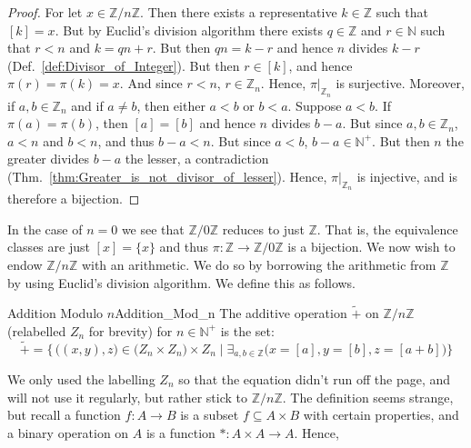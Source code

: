     \begin{proof}
        For let $x\in\mathbb{Z}/n\mathbb{Z}$. Then there exists a
        representative $k\in\mathbb{Z}$ such that $[k]=x$. But by
        Euclid's division algorithm there exists $q\in\mathbb{Z}$ and
        $r\in\mathbb{N}$ such that $r<n$ and $k=qn+r$. But then
        $qn=k-r$ and hence $n$ divides $k-r$
        (Def.~\ref{def:Divisor_of_Integer}). But then $r\in[k]$, and
        hence $\pi(r)=\pi(k)=x$. And since $r<n$, $r\in\mathbb{Z}_{n}$.
        Hence, $\pi|_{\mathbb{Z}_{n}}$ is surjective. Moreover, if
        $a,b\in\mathbb{Z}_{n}$ and if $a\ne{b}$, then either $a<b$ or
        $b<a$. Suppose $a<b$. If $\pi(a)=\pi(b)$, then $[a]=[b]$ and
        hence $n$ divides $b-a$. But since $a,b\in\mathbb{Z}_{n}$, $a<n$
        and $b<n$, and thus $b-a<n$. But since $a<b$,
        $b-a\in\mathbb{N}^{+}$. But then $n$ the greater divides $b-a$
        the lesser, a contradiction
        (Thm.~\ref{thm:Greater_is_not_divisor_of_lesser}). Hence,
        $\pi|_{\mathbb{Z}_{n}}$ is injective, and is therefore a
        bijection. 
    \end{proof}
    In the case of $n=0$ we see that $\mathbb{Z}/0\mathbb{Z}$ reduces to
    just $\mathbb{Z}$. That is, the equivalence classes are just
    $[x]=\{x\}$ and thus
    $\pi:\mathbb{Z}\rightarrow\mathbb{Z}/0\mathbb{Z}$ is a bijection. We
    now wish to endow $\mathbb{Z}/n\mathbb{Z}$ with an arithmetic. We do
    so by borrowing the arithmetic from $\mathbb{Z}$ by using Euclid's
    division algorithm. We define this as follows.
    \begin{fdefinition}{Addition Modulo $n$}{Addition_Mod_n}
        The additive operation $\tilde{+}$ on $\mathbb{Z}/n\mathbb{Z}$
        (relabelled $Z_{n}$ for brevity) for $n\in\mathbb{N}^{+}$ is the
        set:
        \begin{equation*}
            \tilde{+}=\big\{\,\big((x,y),z\big)
                \in\big(Z_{n}\times{Z}_{n}\big)\times{Z}_{n}\;\big|\;
                \exists_{a,b\in\mathbb{Z}}
                \big(x=[a],y=[b],z=[a+b]\big)\big\}
        \end{equation*}
    \end{fdefinition}
    We only used the labelling $Z_{n}$ so that the equation didn't
    run off the page, and will not use it regularly, but rather stick
    to $\mathbb{Z}/n\mathbb{Z}$. The definition seems strange, but
    recall a function $f:A\rightarrow{B}$ is a subset
    $f\subseteq{A}\times{B}$ with certain properties, and a binary
    operation on $A$ is a function $*:A\times{A}\rightarrow{A}$. Hence,
